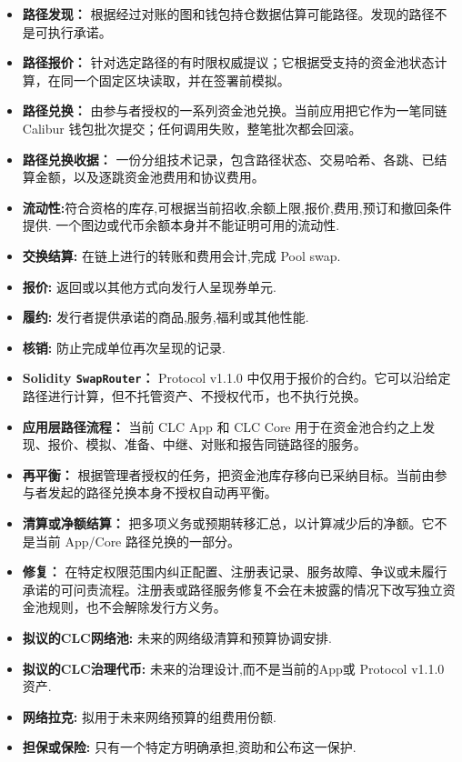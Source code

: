 \documentclass[11pt]{article}
\begin{document}
\begin{itemize}[leftmargin=*]
\item \textbf{路径发现：} 根据经过对账的图和钱包持仓数据估算可能路径。发现的路径不是可执行承诺。
\item \textbf{路径报价：} 针对选定路径的有时限权威提议；它根据受支持的资金池状态计算，在同一个固定区块读取，并在签署前模拟。
\item \textbf{路径兑换：} 由参与者授权的一系列资金池兑换。当前应用把它作为一笔同链 Calibur 钱包批次提交；任何调用失败，整笔批次都会回滚。
\item \textbf{路径兑换收据：} 一份分组技术记录，包含路径状态、交易哈希、各跳、已结算金额，以及逐跳资金池费用和协议费用。
\item \textbf{流动性:}符合资格的库存,可根据当前招收,余额上限,报价,费用,预订和撤回条件提供. 一个图边或代币余额本身并不能证明可用的流动性.
\item \textbf{交换结算:} 在链上进行的转账和费用会计,完成 Pool swap.
\item \textbf{报价:} 返回或以其他方式向发行人呈现券单元.
\item \textbf{履约:} 发行者提供承诺的商品,服务,福利或其他性能.
\item \textbf{核销:} 防止完成单位再次呈现的记录.
\item \textbf{Solidity \texttt{SwapRouter}：} Protocol v1.1.0 中仅用于报价的合约。它可以沿给定路径进行计算，但不托管资产、不授权代币，也不执行兑换。
\item \textbf{应用层路径流程：} 当前 CLC App 和 CLC Core 用于在资金池合约之上发现、报价、模拟、准备、中继、对账和报告同链路径的服务。
\item \textbf{再平衡：} 根据管理者授权的任务，把资金池库存移向已采纳目标。当前由参与者发起的路径兑换本身不授权自动再平衡。
\item \textbf{清算或净额结算：} 把多项义务或预期转移汇总，以计算减少后的净额。它不是当前 App/Core 路径兑换的一部分。
\item \textbf{修复：} 在特定权限范围内纠正配置、注册表记录、服务故障、争议或未履行承诺的可问责流程。注册表或路径服务修复不会在未披露的情况下改写独立资金池规则，也不会解除发行方义务。
\item \textbf{拟议的CLC网络池:} 未来的网络级清算和预算协调安排.
\item \textbf{拟议的CLC治理代币:} 未来的治理设计,而不是当前的App或 Protocol v1.1.0 资产.
\item \textbf{网络拉克:} 拟用于未来网络预算的组费用份额.
\item \textbf{担保或保险:} 只有一个特定方明确承担,资助和公布这一保护.
\end{itemize}
\end{document}
